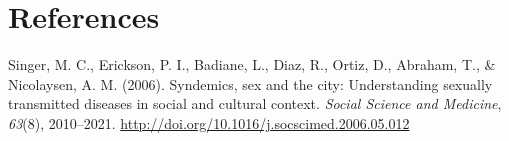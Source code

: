 \documentclass [11pt, proquest] {uwthesis}[2015/03/03]
\begin{document}
\chapter*{References}\label{references}


\noindent

\setlength{\parindent}{-0.20in} \setlength{\leftskip}{0.20in}
\setlength{\parskip}{8pt}

\hypertarget{refs}{}
\hypertarget{ref-Singer2006}{}
Singer, M. C., Erickson, P. I., Badiane, L., Diaz, R., Ortiz, D.,
Abraham, T., \& Nicolaysen, A. M. (2006). Syndemics, sex and the city:
Understanding sexually transmitted diseases in social and cultural
context. \emph{Social Science and Medicine}, \emph{63}(8), 2010--2021.
\url{http://doi.org/10.1016/j.socscimed.2006.05.012}
\end{document}
